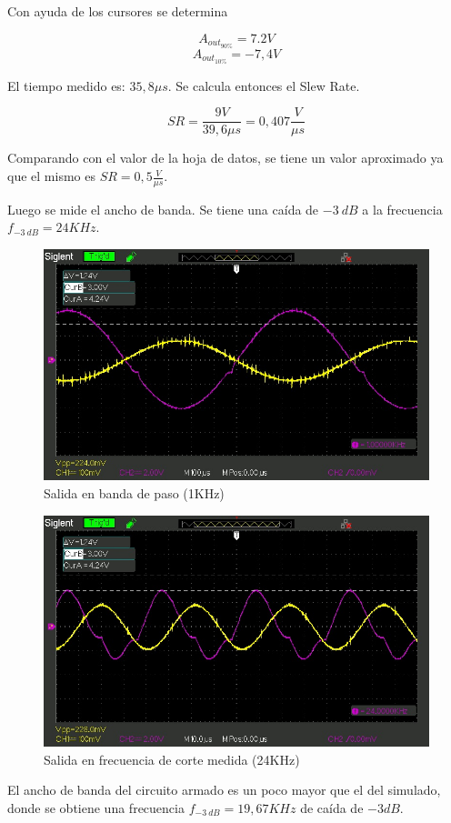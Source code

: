 Con ayuda de los cursores se determina

$$A_{out_{90\%}}= 7.2V$$
$$A_{out_{10\%}}= -7,4V$$


El tiempo medido es: \(35,8\mu s\). Se calcula entonces el Slew Rate.


\[SR= \frac{9V}{39,6\mu s}= 0,407\frac{V}{\mu s}\]

Comparando con el valor de la hoja de datos, se tiene un valor aproximado ya que el mismo es \(SR= 0,5 \frac{V}{\mu s}\).

Luego se mide el ancho de banda. Se tiene una caída de \(-3~dB\) a la frecuencia \(f_{-3~dB}= 24KHz\).

\begin{figure}[H]
    \centering
    \includegraphics[width=0.75\linewidth]{SDS00019.jpg}
    \caption{Salida en banda de paso (1KHz)}
    \label{fig:enter-label}
\end{figure}

\begin{figure}[H]
    \centering
    \includegraphics[width=0.75\linewidth]{SDS00020.jpg}
    \caption{Salida en frecuencia de corte medida (24KHz)}
    \label{fig:enter-label}
\end{figure}

El ancho de banda del circuito armado es un poco mayor que el del simulado, donde se obtiene una frecuencia \(f_{-3~dB}= 19,67KHz\) de caída de \(-3dB\).

